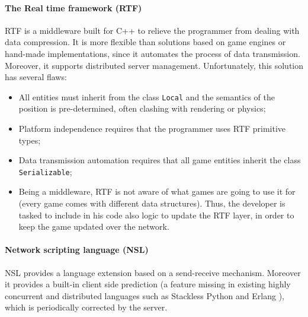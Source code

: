 \paragraph{The Real time framework (RTF)} RTF \cite{glinka2007rtf} is a middleware built for C++ to relieve the programmer from dealing with data compression. It is more flexible than solutions based on game engines or hand-made implementations, since it automates the process of data transmission. Moreover, it supports distributed server management. Unfortunately, this solution has several flaws:
\begin{itemize}
	\item All entities must inherit from the class \texttt{Local} and the semantics of the position is pre-determined, often clashing with rendering or physics;
	\item Platform independence requires that the programmer uses RTF primitive	types;
	\item Data transmission automation requires that all game entities inherit the class \\ \texttt{Serializable};
	\item Being a middleware, RTF is not aware of what games are going to use it for (every game comes with different data structures). Thus, the developer is tasked to include in his code also logic to update the RTF layer, in order to keep the game updated over the network.
\end{itemize}


\paragraph{Network scripting language (NSL)} NSL \cite{russell2008tackling} provides a language extension based on a send-receive mechanism. Moreover it provides a built-in client side prediction (a feature missing in existing highly concurrent and distributed languages such as Stackless Python \cite{kalogirou2005multithreaded} and Erlang \cite{armstrong1993concurrent}), which is periodically corrected by the server. 

